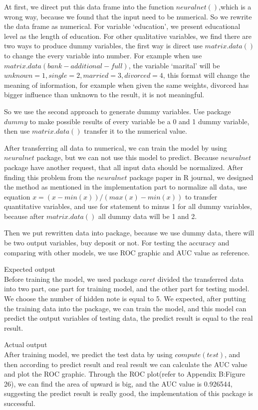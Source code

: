 \documentclass[12pt, a4paper, bibliography=totoc, english]{scrartcl}
\begin{document}
At first, we direct put this data frame into the function $neuralnet()$,which is a wrong way, because we found that the input need to be numerical. So we rewrite the data frame as numerical. For variable `education', we present educational level as the length of education. For other qualitative variables, we find there are two ways to produce dummy variables, the first way is direct use $matrix.data()$ to change the every variable into number. For example when use $matrix.data (bank-additional-full)$, the variable `marital' will be $unknown=1, single=2, married=3, divorced=4$, this format will change the meaning of information, for example when given the same weights, divorced has bigger influence than unknown to the result, it is not meaningful.

So we use the second approach to generate dummy variables. Use package $dummy$ to make possible results of every variable be a 0 and 1 dummy variable, then use $matrix.data()$ transfer it to the numerical value.

After transferring all data to numerical, we can train the model by using $neuralnet$ package, but we can not use this model to predict. Because $neuralnet$ package have another request, that all input data should be normalized. After finding this problem from the $neuralnet$ package paper in R journal, we designed the method as mentioned in the implementation part to normalize all data, use equation $x=(x-min(x))/(max(x)-min(x))$ to transfer quantitative variables, and use for statement to minus 1 for all dummy variables, because after $matrix.data()$ all dummy data will be 1 and 2.

Then we put rewritten data into package, because we use dummy data, there will be two output variables, buy deposit or not. For testing the accuracy and comparing with other models, we use ROC graphic and AUC value as reference.

\textbullet\quad Expected output \\
Before training the model, we used package $caret$ divided the transferred data into two part, one part for training model, and the other part for testing model. We choose the number of hidden note is equal to 5. We expected, after putting the training data into the package, we can train the model, and this model can predict the output variables of testing data, the predict result is equal to the real result. 

\textbullet\quad Actual output \\
After training model, we predict the test data by using $compute(test)$, and then according to predict result and real result we can calculate the AUC value and plot the ROC graphic. Through the ROC plot(refer to Appendix B:Figure 26), we can find the area of upward is big, and the AUC value is 0.926544, suggesting the predict result is really good, the implementation of this package is successful.
\end{document}
